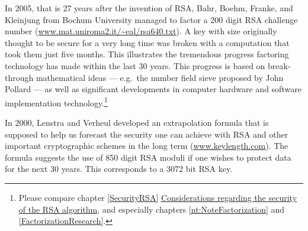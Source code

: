 In 2005, that is 27 years after the invention of
RSA, Bahr, Boehm, Franke, and Kleinjung from
Bochum University managed to factor a 200 digit
RSA challenge number
(\url{www.mat.uniroma2.it/~eal/rsa640.txt}).  A
key with size originally thought to be secure for
a very long time was broken with a computation
that took them just five months.  This illustrates
the tremendous progress factoring technology has
made within the last 30 years.  This progress is
based on break-through mathematical ideas --- e.g.\
the number field sieve proposed by John
Pollard --- as well as significant developments in
computer hardware and software implementation
technology.\footnote{%
Please compare chapter \ref{SecurityRSA}
\hyperlink{SecurityRSA}{Considerations regarding the
security of the RSA algorithm}, and especially chapters
\ref{nt:NoteFactorization} and \ref{FactorizationResearch}.
}

In 2000, Lenstra and Verheul
developed an extrapolation formula that is supposed
to help us forecast the security
one can achieve with RSA and other important
cryptographic schemes in the long
term (\url{www.keylength.com}).  The formula
suggests the use of 850 digit RSA moduli if one
wishes to protect data for the next 30 years.
This corresponds to a 3072 bit RSA key.

